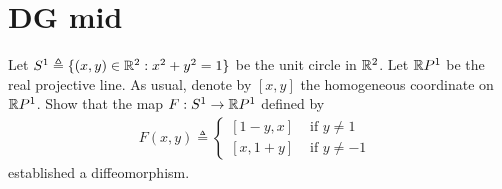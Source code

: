 \documentclass{report}
\date{}
\begin{document}
\newpage%
\chapter{DG mid}
\begin{question}{}{}
Let $S^1\triangleq \{ (x,y)\in\mathbb{R}^2:x^2+y^2=1 \}$ be the unit circle in $\mathbb{R}^2$. Let  $\mathbb{R} P^1$ be the real projective line. As usual, denote by $[x,y]$ the homogeneous coordinate on $\mathbb{R} P^1$. Show that the map  $F:S^1\rightarrow \mathbb{R} P^1$ defined by 
\begin{align*}
F(x,y)\triangleq \begin{cases}
  [1-y,x]& \text{ if $y\neq 1$ }\\
  [x,1+y]& \text{ if $y\neq -1$ }
\end{cases}
\end{align*}
established a diffeomorphism. 
\end{question}
\end{document}
